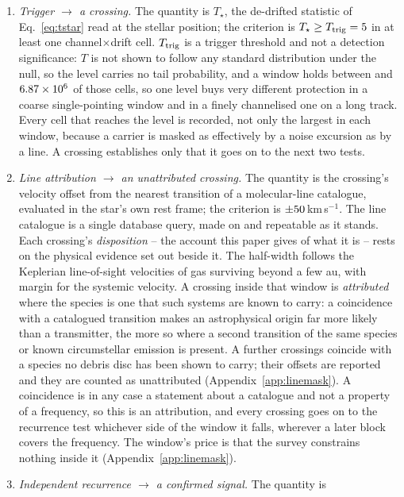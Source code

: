 \begin{enumerate}[label=(\roman*),leftmargin=1.9em,itemsep=3pt,topsep=3pt,parsep=0pt]
\item \emph{Trigger $\to$ a crossing.} The quantity is $T_\star$, the
de-drifted statistic of Eq.~\ref{eq:tstar} read at the stellar position; the
criterion is $T_\star\geq T_{\rm trig}=5$ in at least one
channel$\times$drift cell. $T_{\rm trig}$ is a trigger
threshold and not a detection significance: $T$ is not shown to follow any
standard distribution under the null, so the level carries no tail
probability, and a window holds between \TuCellsLo{} and $6.87 \times 10^{6}$ of
those cells, so one level buys very different protection in a coarse
single-pointing window and in a finely channelised one on a long track. Every
cell that reaches the level is recorded, not only the largest in each window,
because a carrier is masked as effectively by a noise excursion as by a line.
A crossing establishes only that it goes on to the next two tests.
\item \emph{Line attribution $\to$ an unattributed crossing.} The quantity
is the crossing's velocity offset from the nearest transition of a
molecular-line catalogue, evaluated in the star's own rest frame; the
criterion is $\pm50$\,km\,s$^{-1}$. The line catalogue is a
single database query, made on \MkListDate{} and repeatable as it stands.
Each crossing's \emph{disposition} -- the account this paper
gives of what it is -- rests on the physical evidence set out beside it.
The half-width follows the Keplerian line-of-sight
velocities of gas
surviving beyond a few au, with margin for the systemic velocity. A crossing
inside that window is \emph{attributed} where the species is one that such
systems are known to carry: a coincidence with a catalogued transition makes
an astrophysical origin far more likely than a transmitter, the more so
where a second transition of the same species or known circumstellar
emission is present. A further \SoNCrossWord{} crossings coincide with a
species no debris disc has been shown to carry; their offsets are reported
and they are counted as unattributed (Appendix~\ref{app:linemask}).
A coincidence is in any case a statement about a catalogue and not a
property of a frequency, so this is an attribution, and
every crossing goes on to the recurrence test whichever side of the
window it falls, wherever a later block covers the frequency. The
window's price is that the survey constrains nothing inside it
(Appendix~\ref{app:linemask}).
\item \emph{Independent recurrence $\to$ a confirmed signal.} The quantity is

\end{enumerate}
